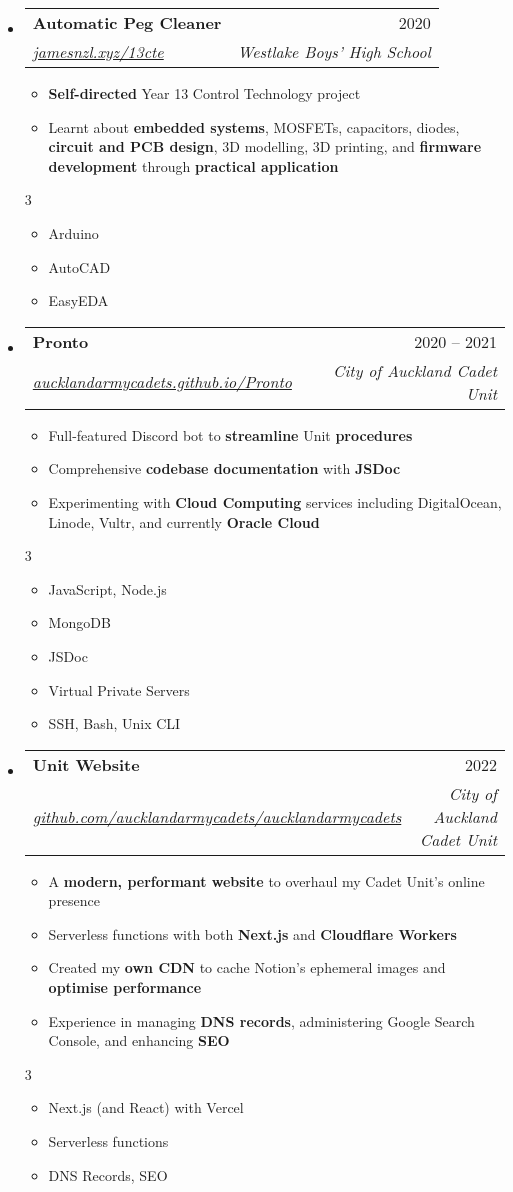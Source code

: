 \documentclass[11pt,a4paper]{article}[leftmargin=*]
\makeatletter
\def \entryspacing {-0pt}
\def \bulletstylei {\faAngleRight\hspace{-4.5pt}}
\def \bulletstyleii {\faCaretRight\hspace{-4.5pt}}
\newcommand{\resumeEntryStart}{\begin{itemize}[leftmargin=2.5mm]}
\newcommand{\resumeEntryEnd}{\end{itemize}\vspace{\entryspacing}}
\newcommand{\resumeItemListStart}{\begin{itemize}[leftmargin=4.5mm]}
\newcommand{\resumeItemListEnd}{\end{itemize}}
\newcommand{\resumeItemListStartColumns}[2][-0.5]{\vspace*{#1\multicolsep}
\begin{multicols}{#2}\begin{itemize}[leftmargin=4.5mm]}
\newcommand{\resumeItemListEndColumns}[1][-1]{\end{itemize}\end{multicols}\vspace*{#1\multicolsep}}
\newcommand{\resumeItem}[2][\bulletstylei]{
  \item[\small#1]\small{
    {#2 \vspace{-2pt}}
  }
}
\newcommand{\resumeEntryTSDL}[4]{
  \vspace{-1pt}\item[]
    \begin{tabularx}{0.97\textwidth}{X@{\hspace{60pt}}r}
      \textbf{\color{primary}#1} & {\firabook\color{accent}\small#2} \\
      \textit{\color{accent}\small#3} & \textit{\color{accent}\small#4} \\
    \end{tabularx}\vspace{-6pt}
}
\newcommand{\resumeBf}[1]{\small\textbf{\color{halfbold}#1}}
\makeatother
\begin{document}
\pagebreak

\resumeEntryStart
\resumeEntryTSDL
{Automatic Peg Cleaner}{2020}
{\href{https://jamesnzl.xyz/13cte}{jamesnzl.xyz/13cte}}{Westlake Boys' High School}
\resumeItemListStart
\resumeItem {\resumeBf{Self-directed} Year 13 Control Technology project}
\resumeItem {Learnt about \resumeBf{embedded systems}, MOSFETs, capacitors, diodes, \resumeBf{circuit and PCB design}, 3D modelling, 3D printing, and \resumeBf{firmware development} through \resumeBf{practical application}}
\resumeItemListEnd
\resumeItemListStartColumns{3}
\resumeItem[\bulletstyleii] {Arduino}
\resumeItem[\bulletstyleii] {AutoCAD}
\resumeItem[\bulletstyleii] {EasyEDA}
\resumeItemListEndColumns
\resumeEntryEnd

\resumeEntryStart
\resumeEntryTSDL
{Pronto}{2020 -- 2021}
{\href{https://aucklandarmycadets.github.io/Pronto/}{aucklandarmycadets.github.io/Pronto}}{City of Auckland Cadet Unit}
\resumeItemListStart
\resumeItem {Full-featured Discord bot to \resumeBf{streamline} Unit \resumeBf{procedures}}
\resumeItem {Comprehensive \resumeBf{codebase documentation} with \resumeBf{JSDoc}}
\resumeItem {Experimenting with \resumeBf{Cloud Computing} services including DigitalOcean, Linode, Vultr, and currently \resumeBf{Oracle Cloud}}
\resumeItemListEnd
\resumeItemListStartColumns{3}
\resumeItem[\bulletstyleii] {JavaScript, Node.js}
\resumeItem[\bulletstyleii] {MongoDB}
\resumeItem[\bulletstyleii] {JSDoc}
\resumeItem[\bulletstyleii] {Virtual Private Servers}
\resumeItem[\bulletstyleii] {SSH, Bash, Unix CLI}
\resumeItemListEndColumns
\resumeEntryEnd

\resumeEntryStart
\resumeEntryTSDL
{Unit Website}{2022}
{\href{https://github.com/aucklandarmycadets/aucklandarmycadets}{github.com/aucklandarmycadets/aucklandarmycadets}}{City of Auckland Cadet Unit}
\resumeItemListStart
\resumeItem {A \resumeBf{modern, performant website} to overhaul my Cadet Unit's online presence}
\resumeItem {Serverless functions with both \resumeBf{Next.js} and \resumeBf{Cloudflare Workers}}
\resumeItem {Created my \resumeBf{own CDN} to cache Notion's ephemeral images and \resumeBf{optimise performance}}
\resumeItem {Experience in managing \resumeBf{DNS records}, administering Google Search Console, and enhancing \resumeBf{SEO}}
\resumeItemListEnd
\resumeItemListStartColumns{3}
\resumeItem[\bulletstyleii] {Next.js (and React) with Vercel}
\resumeItem[\bulletstyleii] {Serverless functions}
\resumeItem[\bulletstyleii] {DNS Records, SEO}
\resumeItemListEndColumns
\resumeEntryEnd
\end{document}
